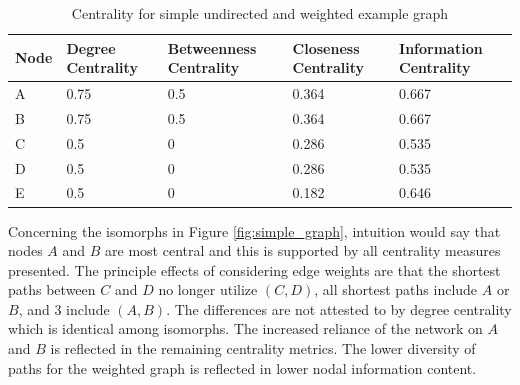 \begin{table}[H]
	\centering
	\caption{Centrality for simple undirected and weighted example graph}
	\label{tab:weighted_centrality}
	\begin{tabular}{|C{.2\linewidth}|C{.2\linewidth}|C{.2\linewidth}|C{.2\linewidth}|C{.2\linewidth}|}
		\hline Node & Degree Centrality & Betweenness Centrality & Closeness Centrality & Information Centrality \\
		\hline A & 0.75 & 0.5 & 0.364 & 0.667 \\
		\hline B & 0.75 & 0.5 & 0.364 & 0.667 \\
		\hline C & 0.5 & 0 & 0.286 & 0.535 \\
		\hline D & 0.5 & 0 & 0.286 & 0.535 \\
		\hline E & 0.5 & 0 & 0.182 & 0.646 \\
		\hline
	\end{tabular}
\end{table}

Concerning the isomorphs in Figure \ref{fig:simple_graph}, intuition would say that nodes $A$ and $B$ are most central and this is supported by all centrality measures presented. The principle effects of considering edge weights are that the shortest paths between $C$ and $D$ no longer utilize $(C, D)$, all shortest paths include $A$ or $B$, and 3 include $(A, B)$. The differences are not attested to by degree centrality which is identical among isomorphs. The increased reliance of the network on $A$ and $B$ is reflected in the remaining centrality metrics. The lower diversity of paths for the weighted graph is reflected in lower nodal information content.

